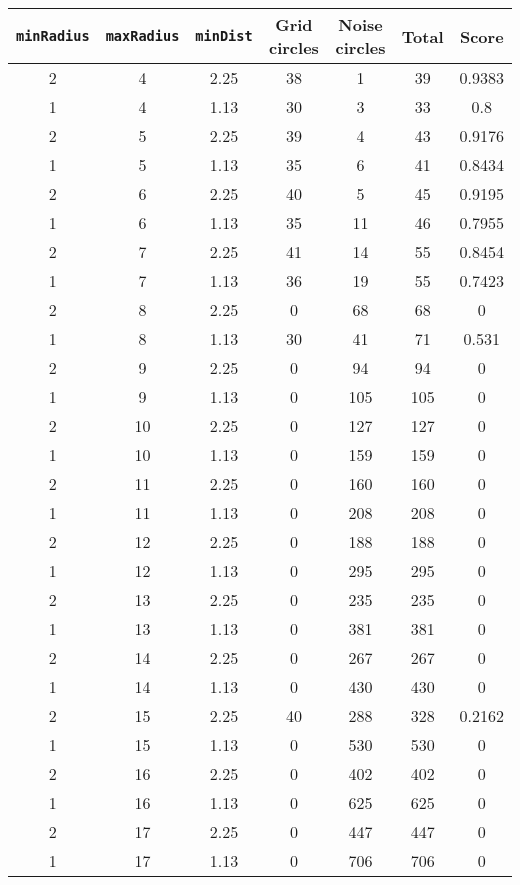 \documentclass[letterpaper, 12pt]{article}
\begin{document}
\begin{longtable}{|c|c|c|c|c|c|c|}
\hline
\textbf{\texttt{minRadius}} & \textbf{\texttt{maxRadius}} & \textbf{\texttt{minDist}} & \textbf{Grid circles} & \textbf{Noise circles} & \textbf{Total} & \textbf{Score} \\
\hline
2 & 4 & 2.25 & 38 & 1 & 39 & 0.9383 \\
\hline
1 & 4 & 1.13 & 30 & 3 & 33 & 0.8 \\
\hline
2 & 5 & 2.25 & 39 & 4 & 43 & 0.9176 \\
\hline
1 & 5 & 1.13 & 35 & 6 & 41 & 0.8434 \\
\hline
2 & 6 & 2.25 & 40 & 5 & 45 & 0.9195 \\
\hline
1 & 6 & 1.13 & 35 & 11 & 46 & 0.7955 \\
\hline
2 & 7 & 2.25 & 41 & 14 & 55 & 0.8454 \\
\hline
1 & 7 & 1.13 & 36 & 19 & 55 & 0.7423 \\
\hline
2 & 8 & 2.25 & 0 & 68 & 68 & 0 \\
\hline
1 & 8 & 1.13 & 30 & 41 & 71 & 0.531 \\
\hline
2 & 9 & 2.25 & 0 & 94 & 94 & 0 \\
\hline
1 & 9 & 1.13 & 0 & 105 & 105 & 0 \\
\hline
2 & 10 & 2.25 & 0 & 127 & 127 & 0 \\
\hline
1 & 10 & 1.13 & 0 & 159 & 159 & 0 \\
\hline
2 & 11 & 2.25 & 0 & 160 & 160 & 0 \\
\hline
1 & 11 & 1.13 & 0 & 208 & 208 & 0 \\
\hline
2 & 12 & 2.25 & 0 & 188 & 188 & 0 \\
\hline
1 & 12 & 1.13 & 0 & 295 & 295 & 0 \\
\hline
2 & 13 & 2.25 & 0 & 235 & 235 & 0 \\
\hline
1 & 13 & 1.13 & 0 & 381 & 381 & 0 \\
\hline
2 & 14 & 2.25 & 0 & 267 & 267 & 0 \\
\hline
1 & 14 & 1.13 & 0 & 430 & 430 & 0 \\
\hline
2 & 15 & 2.25 & 40 & 288 & 328 & 0.2162 \\
\hline
1 & 15 & 1.13 & 0 & 530 & 530 & 0 \\
\hline
2 & 16 & 2.25 & 0 & 402 & 402 & 0 \\
\hline
1 & 16 & 1.13 & 0 & 625 & 625 & 0 \\
\hline
2 & 17 & 2.25 & 0 & 447 & 447 & 0 \\
\hline
1 & 17 & 1.13 & 0 & 706 & 706 & 0 \\

\end{longtable}
\end{document}
